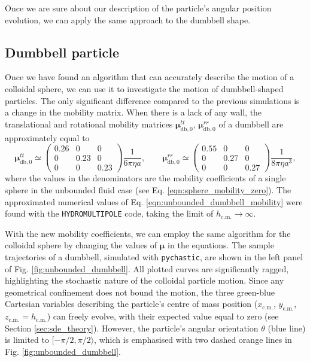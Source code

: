 \documentclass{master_thesis}
\def\code#1{\texttt{#1}}
\begin{document}
Once we are sure about our description of the particle's angular position evolution, we can apply the same approach to the dumbbell shape.

\subsection{Dumbbell particle}

Once we have found an algorithm that can accurately describe the motion of a colloidal sphere, we can use it to investigate the motion of dumbbell-shaped particles. The only significant difference compared to the previous simulations is a change in the mobility matrix. When there is a lack of any wall, the translational and rotational mobility matrices $\bm{\mu}^{tt}_{\textrm{db},0}$, $\bm{\mu}^{rr}_{\textrm{db},0}$ of a dumbbell are approximately equal to
\begin{equation}
    \bm{\mu}^{tt}_{\textrm{db},0} \simeq 
    \begin{pmatrix}
        0.26 & 0 & 0\\
        0 & 0.23 & 0\\
        0 & 0 & 0.23
    \end{pmatrix} \frac{1}{6 \pi \eta a},
    \qquad
    \bm{\mu}^{rr}_{\textrm{db},0} \simeq 
    \begin{pmatrix}
        0.55 & 0 & 0\\
        0 & 0.27 & 0\\
        0 & 0 & 0.27
    \end{pmatrix} \frac{1}{8 \pi \eta a^3},
\label{eqn:unbounded_dumbbell_mobility}
\end{equation}
where the values in the denominators are the mobility coefficients of a single sphere in the unbounded fluid case (see Eq. \eqref{eqn:sphere_mobility_zero}). The approximated numerical values of Eq. \eqref{eqn:unbounded_dumbbell_mobility} were found with the \code{HYDROMULTIPOLE} code, taking the limit of $h_{\textrm{c.m.}}\rightarrow \infty$.

With the new mobility coefficients, we can employ the same algorithm for the colloidal sphere by changing the values of $\bm{\mu}$ in the equations. The sample trajectories of a dumbbell, simulated with \code{pychastic}, are shown in the left panel of Fig. \ref{fig:unbounded_dumbbell}. All plotted curves are significantly ragged, highlighting the stochastic nature of the colloidal particle motion. Since any geometrical confinement does not bound the motion, the three green-blue Cartesian variables describing the particle's centre of mass position ($x_{\textrm{c.m.}}$, $y_{\textrm{c.m.}}$, $z_{\textrm{c.m.}}=h_{\textrm{c.m.}}$) can freely evolve, with their expected value equal to zero (see Section \ref{sec:sde_theory}). However, the particle's angular orientation $\theta$ (blue line) is limited to $[-\pi/2, \pi/2\rangle$, which is emphasised with two dashed orange lines in Fig. \ref{fig:unbounded_dumbbell}. 
\end{document}
